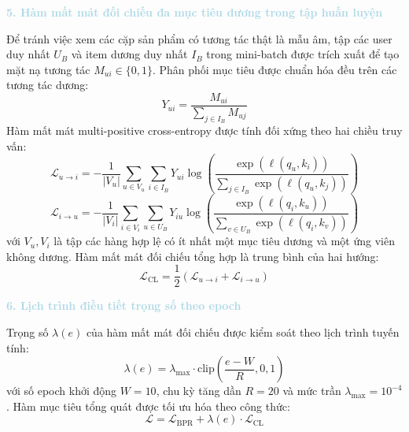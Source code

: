 \noindent\textcolor{lightblue}{\textbf{5. Hàm mất mát đối chiếu đa mục tiêu dương trong tập huấn luyện}}

Để tránh việc xem các cặp sản phẩm có tương tác thật là mẫu âm, tập các user duy nhất $U_B$ và item dương duy nhất $I_B$ trong mini-batch được trích xuất để tạo mặt nạ tương tác $M_{ui} \in \{0, 1\}$. Phân phối mục tiêu được chuẩn hóa đều trên các tương tác dương:
\begin{equation}
Y_{ui} = \frac{M_{ui}}{\sum_{j \in I_B} M_{uj}}
\end{equation}
Hàm mất mát multi-positive cross-entropy được tính đối xứng theo hai chiều truy vấn:
\begin{equation}
\mathcal{L}_{u \to i} = -\frac{1}{|V_u|} \sum_{u \in V_u} \sum_{i \in I_B} Y_{ui} \log \left( \frac{\exp(\ell(q_u, k_i))}{\sum_{j \in I_B} \exp(\ell(q_u, k_j))} \right)
\end{equation}
\begin{equation}
\mathcal{L}_{i \to u} = -\frac{1}{|V_i|} \sum_{i \in V_i} \sum_{u \in U_B} Y_{iu} \log \left( \frac{\exp(\ell(q_i, k_u))}{\sum_{v \in U_B} \exp(\ell(q_i, k_v))} \right)
\end{equation}
với $V_u, V_i$ là tập các hàng hợp lệ có ít nhất một mục tiêu dương và một ứng viên không dương. Hàm mất mát đối chiếu tổng hợp là trung bình của hai hướng:
\begin{equation}
\mathcal{L}_{\text{CL}} = \frac{1}{2}(\mathcal{L}_{u \to i} + \mathcal{L}_{i \to u})
\end{equation}

\noindent\textcolor{lightblue}{\textbf{6. Lịch trình điều tiết trọng số theo epoch}}

Trọng số $\lambda(e)$ của hàm mất mát đối chiếu được kiểm soát theo lịch trình tuyến tính:
\begin{equation}
\lambda(e) = \lambda_{\max} \cdot \text{clip}\left(\frac{e - W}{R}, 0, 1\right)
\end{equation}
với số epoch khởi động $W = 10$, chu kỳ tăng dần $R = 20$ và mức trần $\lambda_{\max} = 10^{-4}$. Hàm mục tiêu tổng quát được tối ưu hóa theo công thức:
\begin{equation}
\mathcal{L} = \mathcal{L}_{\text{BPR}} + \lambda(e) \cdot \mathcal{L}_{\text{CL}}
\end{equation}

